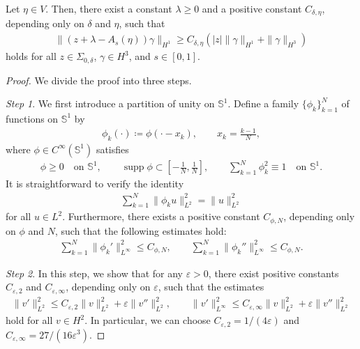 \documentclass[10pt,a4paper]{amsart}
\newcommand{\supp}{\operatorname{supp}}
\begin{document}
\begin{lemma}
    \label{lem:resolvent_estimate}
    Let $\eta\in V$.
    Then, there exist a constant $\lambda\ge0$ and a positive constant $C_{\delta,\eta}$, depending only on $\delta$ and $\eta$, such that
    \begin{align}
        \|(z+\lambda-A_s(\eta))\gamma\|_{H^1} \ge C_{\delta,\eta}\left(|z|\|\gamma\|_{H^1} + \|\gamma\|_{H^3}\right)
        \label{eq:resolvent_estimate}
    \end{align}
    holds for all $z\in\Sigma_{0,\delta}$, $\gamma\in H^3$, and $s\in[0,1]$.
\end{lemma}

\begin{proof}
We divide the proof into three steps.

\textit{Step 1}.
We first introduce a partition of unity on $\mathbb{S}^1$.
Define a family $\{\phi_k\}_{k=1}^N$ of functions on $\mathbb{S}^1$ by
\begin{align*}
    \phi_k(\cdot)\coloneqq\phi(\cdot-x_k),\qquad
    x_k=\frac{k-1}{N},
\end{align*}
where $\phi\in C^\infty(\mathbb{S}^1)$ satisfies
\begin{align}
    \phi\ge0\quad\text{on }\mathbb{S}^1,\qquad
    \supp\phi\subset\left[-\frac{1}{N},\frac{1}{N}\right],\qquad
    \sum_{k=1}^N\phi_k^2\equiv1\quad\text{on }\mathbb{S}^1.
    \label{eq:partition-of-unity}
\end{align}
It is straightforward to verify the identity
\begin{align}
    \sum_{k=1}^N\|\phi_k u\|_{L^2}^2 = \|u\|_{L^2}^2
    \label{eq:sum_phi_k-u_L2}
\end{align}
for all $u\in L^2$.
Furthermore, there exists a positive constant $C_{\phi,N}$, depending only on $\phi$ and $N$, such that the following estimates hold:
\begin{align}
    \sum_{k=1}^N\|\phi_k'\|_{L^\infty}^2\le C_{\phi,N},\qquad
    \sum_{k=1}^N\|\phi_k''\|_{L^\infty}^2 \le C_{\phi,N}.
    \label{eq:phi'_phi''_estimate}
\end{align}

\textit{Step 2}.
In this step, we show that for any $\varepsilon>0$, there exist positive constants $C_{\varepsilon,2}$ and $C_{\varepsilon,\infty}$, depending only on $\varepsilon$, such that the estimates
\begin{align}
    \|v'\|_{L^2}^2 \le C_{\varepsilon,2}\|v\|_{L^2}^2 + \varepsilon\|v''\|_{L^2}^2,\qquad
    \|v'\|_{L^\infty}^2 \le C_{\varepsilon,\infty}\|v\|_{L^2}^2 + \varepsilon\|v''\|_{L^2}^2
    \label{eq:v'_L2_Linf}
\end{align}
hold for all $v\in H^2$.
In particular, we can choose $C_{\varepsilon,2}=1/(4\varepsilon)$ and $C_{\varepsilon,\infty}=27/(16\varepsilon^3)$.


\end{proof}
\end{document}
